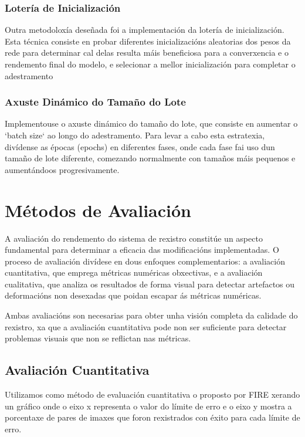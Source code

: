 \subsubsection{Lotería de Inicialización}
\label{subsubsec:loteria_inicializacion}
Outra metodoloxía deseñada foi a implementación da lotería de inicialización. Esta técnica consiste en probar diferentes inicializacións aleatorias dos pesos da rede para determinar cal delas resulta máis beneficiosa para a converxencia e o rendemento final do modelo, e selecionar a mellor inicialización para completar o adestramento

\subsubsection{Axuste Dinámico do Tamaño do Lote}
\label{subsubsec:axuste_dinamico_batch_size}
Implementouse o axuste dinámico do tamaño do lote, que consiste en aumentar o `batch size` ao longo do adestramento. Para levar a cabo esta estratexia, divídense as épocas (epochs) en diferentes fases, onde cada fase fai uso dun tamaño de lote diferente, comezando normalmente con tamaños máis pequenos e aumentándoos progresivamente.



\section{Métodos de Avaliación}
\label{sec:Métodos de Avaliación}

A avaliación do rendemento do sistema de rexistro constitúe un aspecto fundamental para determinar a eficacia das modificacións implementadas. 
O proceso de avaliación divídese en dous enfoques complementarios: a avaliación cuantitativa, que emprega métricas numéricas obxectivas, e a avaliación cualitativa, que analiza os resultados de forma visual para detectar artefactos ou deformacións non desexadas que poidan escapar ás métricas numéricas.

 Ambas avaliacións son necesarias para obter unha visión completa da calidade do rexistro, xa que a avaliación cuantitativa pode non ser suficiente para detectar problemas visuais que non se reflictan nas métricas.

 \subsection{Avaliación Cuantitativa}
 \label{subsec:Avaliación Cuantitativa}
 
 Utilizamos como método de evaluación cuantitativa o proposto por FIRE \cite{FIRE}
 xerando un gráfico onde o eixo x representa o valor do límite de erro e o eixo y mostra a porcentaxe de pares de imaxes que foron rexistrados con éxito para cada límite de erro.
 
